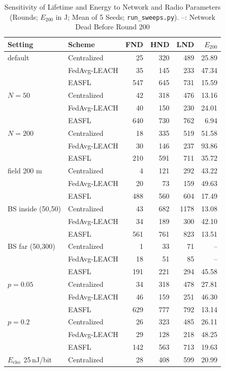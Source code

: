 \documentclass[journal,onecolumn]{IEEEtran}
\begin{document}
\begin{table}[h]\caption{Sensitivity of Lifetime and Energy to Network and Radio Parameters (Rounds; $E_{200}$ in J; Mean of 5 Seeds; \texttt{run\_sweeps.py}). --: Network Dead Before Round 200}\centering\small
\begin{tabular}{@{}llrrrr@{}}\toprule Setting & Scheme & FND & HND & LND & $E_{200}$\\\midrule
default & Centralized & 25 & 320 & 489 & 25.89\\
 & FedAvg-LEACH & 35 & 145 & 233 & 47.34\\
 & EASFL & 547 & 645 & 731 & 15.59\\
\midrule
$N=50$ & Centralized & 42 & 318 & 476 & 13.16\\
 & FedAvg-LEACH & 40 & 150 & 230 & 24.01\\
 & EASFL & 640 & 730 & 762 & 6.94\\
\midrule
$N=200$ & Centralized & 18 & 335 & 519 & 51.58\\
 & FedAvg-LEACH & 30 & 146 & 237 & 93.86\\
 & EASFL & 210 & 591 & 711 & 35.72\\
\midrule
field 200 m & Centralized & 4 & 121 & 292 & 43.22\\
 & FedAvg-LEACH & 20 & 73 & 159 & 49.63\\
 & EASFL & 488 & 560 & 604 & 17.49\\
\midrule
BS inside (50,50) & Centralized & 43 & 682 & 1178 & 13.08\\
 & FedAvg-LEACH & 34 & 189 & 300 & 42.10\\
 & EASFL & 561 & 761 & 823 & 13.51\\
\midrule
BS far (50,300) & Centralized & 1 & 33 & 71 & --\\
 & FedAvg-LEACH & 18 & 51 & 85 & --\\
 & EASFL & 191 & 221 & 294 & 45.58\\
\midrule
$p=0.05$ & Centralized & 34 & 318 & 478 & 27.81\\
 & FedAvg-LEACH & 46 & 159 & 251 & 46.30\\
 & EASFL & 629 & 777 & 792 & 13.14\\
\midrule
$p=0.2$ & Centralized & 26 & 323 & 485 & 26.11\\
 & FedAvg-LEACH & 29 & 128 & 218 & 48.25\\
 & EASFL & 142 & 563 & 713 & 19.63\\
\midrule
$E_{\mathrm{elec}}$ 25\,nJ/bit & Centralized & 28 & 408 & 599 & 20.99\\

\end{tabular}
\end{table}
\end{document}
